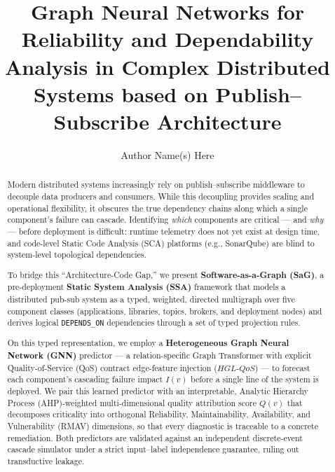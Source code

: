 \documentclass[review]{elsarticle}
\begin{document}
\begin{frontmatter}

\title{Graph Neural Networks for Reliability and Dependability Analysis in Complex Distributed Systems based on Publish--Subscribe Architecture}

\author{Author Name(s) Here}
\address{Affiliation Here}

\begin{abstract}
Modern distributed systems increasingly rely on publish--subscribe middleware to decouple data
producers and consumers. While this decoupling provides scaling and operational flexibility, it
obscures the true dependency chains along which a single component's failure can cascade.
Identifying \emph{which} components are critical --- and \emph{why} --- before deployment is
difficult: runtime telemetry does not yet exist at design time, and code-level Static Code Analysis
(SCA) platforms (e.g., SonarQube) are blind to system-level topological dependencies.

To bridge this ``Architecture-Code Gap,'' we present \textbf{Software-as-a-Graph (SaG)}, a
pre-deployment \textbf{Static System Analysis (SSA)} framework that models a distributed pub-sub
system as a typed, weighted, directed multigraph over five component classes (applications,
libraries, topics, brokers, and deployment nodes) and derives logical \texttt{DEPENDS\_ON}
dependencies through a set of typed projection rules.

On this typed representation, we employ a \textbf{Heterogeneous Graph Neural Network (GNN)}
predictor --- a relation-specific Graph Transformer with explicit Quality-of-Service (QoS) contract
edge-feature injection ($HGL\text{-}QoS$) --- to forecast each component's cascading failure impact
$I(v)$ before a single line of the system is deployed. We pair this learned predictor with an
interpretable, Analytic Hierarchy Process (AHP)-weighted multi-dimensional quality attribution score
$Q(v)$ that decomposes criticality into orthogonal Reliability, Maintainability, Availability, and
Vulnerability (RMAV) dimensions, so that every diagnostic is traceable to a concrete remediation.
Both predictors are validated against an independent discrete-event cascade simulator under a strict
input--label independence guarantee, ruling out transductive leakage.


\end{abstract}
\end{frontmatter}
\end{document}
